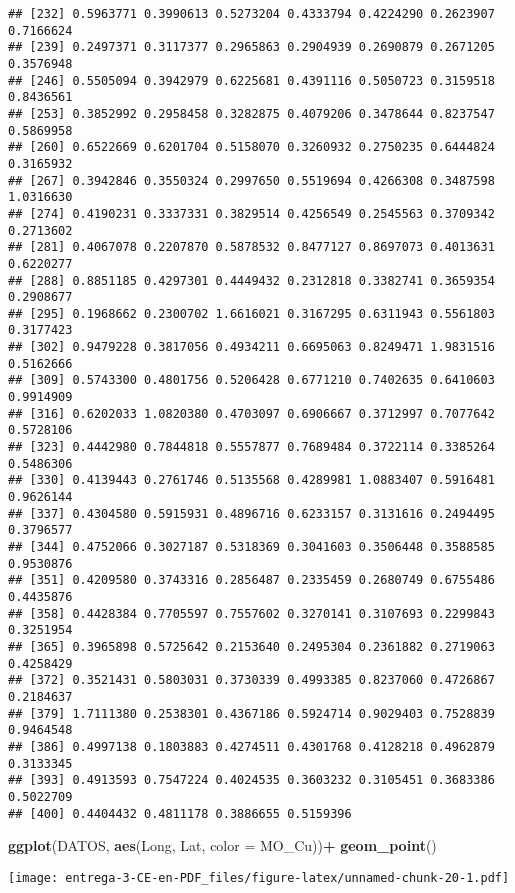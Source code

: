 \documentclass[
]{article}
\newenvironment{Shaded}{\begin{snugshade}}{\end{snugshade}}
\newcommand{\DataTypeTok}[1]{\textcolor[rgb]{0.13,0.29,0.53}{#1}}
\newcommand{\KeywordTok}[1]{\textcolor[rgb]{0.13,0.29,0.53}{\textbf{#1}}}
\newcommand{\NormalTok}[1]{#1}
\newcommand{\OperatorTok}[1]{\textcolor[rgb]{0.81,0.36,0.00}{\textbf{#1}}}
\newcommand{\StringTok}[1]{\textcolor[rgb]{0.31,0.60,0.02}{#1}}
\begin{document}
\begin{verbatim}
## [232] 0.5963771 0.3990613 0.5273204 0.4333794 0.4224290 0.2623907 0.7166624
## [239] 0.2497371 0.3117377 0.2965863 0.2904939 0.2690879 0.2671205 0.3576948
## [246] 0.5505094 0.3942979 0.6225681 0.4391116 0.5050723 0.3159518 0.8436561
## [253] 0.3852992 0.2958458 0.3282875 0.4079206 0.3478644 0.8237547 0.5869958
## [260] 0.6522669 0.6201704 0.5158070 0.3260932 0.2750235 0.6444824 0.3165932
## [267] 0.3942846 0.3550324 0.2997650 0.5519694 0.4266308 0.3487598 1.0316630
## [274] 0.4190231 0.3337331 0.3829514 0.4256549 0.2545563 0.3709342 0.2713602
## [281] 0.4067078 0.2207870 0.5878532 0.8477127 0.8697073 0.4013631 0.6220277
## [288] 0.8851185 0.4297301 0.4449432 0.2312818 0.3382741 0.3659354 0.2908677
## [295] 0.1968662 0.2300702 1.6616021 0.3167295 0.6311943 0.5561803 0.3177423
## [302] 0.9479228 0.3817056 0.4934211 0.6695063 0.8249471 1.9831516 0.5162666
## [309] 0.5743300 0.4801756 0.5206428 0.6771210 0.7402635 0.6410603 0.9914909
## [316] 0.6202033 1.0820380 0.4703097 0.6906667 0.3712997 0.7077642 0.5728106
## [323] 0.4442980 0.7844818 0.5557877 0.7689484 0.3722114 0.3385264 0.5486306
## [330] 0.4139443 0.2761746 0.5135568 0.4289981 1.0883407 0.5916481 0.9626144
## [337] 0.4304580 0.5915931 0.4896716 0.6233157 0.3131616 0.2494495 0.3796577
## [344] 0.4752066 0.3027187 0.5318369 0.3041603 0.3506448 0.3588585 0.9530876
## [351] 0.4209580 0.3743316 0.2856487 0.2335459 0.2680749 0.6755486 0.4435876
## [358] 0.4428384 0.7705597 0.7557602 0.3270141 0.3107693 0.2299843 0.3251954
## [365] 0.3965898 0.5725642 0.2153640 0.2495304 0.2361882 0.2719063 0.4258429
## [372] 0.3521431 0.5803031 0.3730339 0.4993385 0.8237060 0.4726867 0.2184637
## [379] 1.7111380 0.2538301 0.4367186 0.5924714 0.9029403 0.7528839 0.9464548
## [386] 0.4997138 0.1803883 0.4274511 0.4301768 0.4128218 0.4962879 0.3133345
## [393] 0.4913593 0.7547224 0.4024535 0.3603232 0.3105451 0.3683386 0.5022709
## [400] 0.4404432 0.4811178 0.3886655 0.5159396
\end{verbatim}

\begin{Shaded}
\begin{Highlighting}[]
\KeywordTok{ggplot}\NormalTok{(DATOS, }\KeywordTok{aes}\NormalTok{(Long, Lat, }\DataTypeTok{color =}\NormalTok{ MO_Cu))}\OperatorTok{+}
\StringTok{  }\KeywordTok{geom_point}\NormalTok{()}
\end{Highlighting}
\end{Shaded}

\texttt{[image: entrega-3-CE-en-PDF\_files/figure-latex/unnamed-chunk-20-1.pdf]}
\end{document}
